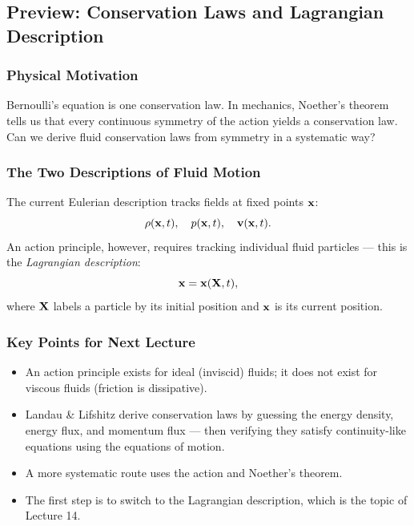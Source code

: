 \documentclass[../main.tex]{subfiles}
\begin{document}
\subsection{Preview: Conservation Laws and Lagrangian Description}\label{sec:lec13:preview}

\subsubsection*{Physical Motivation}
Bernoulli's equation is one conservation law. In mechanics, Noether's theorem tells us that every continuous symmetry of the action yields a conservation law. Can we derive fluid conservation laws from symmetry in a systematic way?

\subsubsection{The Two Descriptions of Fluid Motion}
The current Eulerian description tracks fields at fixed points $\mathbf{x}$:
\begin{equation}
  \rho(\mathbf{x},t),\quad p(\mathbf{x},t),\quad \mathbf{v}(\mathbf{x},t).
\end{equation}
An action principle, however, requires tracking individual fluid particles — this is the \emph{Lagrangian description}:
\begin{equation}
  \mathbf{x}=\mathbf{x}(\mathbf{X},t),
\end{equation}
where $\mathbf{X}$ labels a particle by its initial position and $\mathbf{x}$ is its current position.

\subsubsection{Key Points for Next Lecture}

\begin{itemize}
  \item An action principle exists for ideal (inviscid) fluids; it does not exist for viscous fluids (friction is dissipative).
  \item Landau \& Lifshitz derive conservation laws by guessing the energy density, energy flux, and momentum flux — then verifying they satisfy continuity-like equations using the equations of motion.
  \item A more systematic route uses the action and Noether's theorem.
  \item The first step is to switch to the Lagrangian description, which is the topic of Lecture 14.
\end{itemize}
\end{document}
